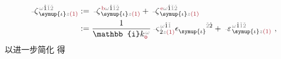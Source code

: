 \begin{subequations}
	\abovedisplayskip=-8pt
\begin{align} %
	\Xint{\begin{smallmatrix} ~ \\ {}^{}_{\mathcolor{gray}{-}} \\ ~ \end{smallmatrix}}{12}{\zeta}^{\;\! \mathcolor{gray}{\omega} \hat{1} \mathcolor{gray}{\check{1} \check{2}}}_{\;\! \symup{\iota} \mathcolor{gray}{z} \textcolor{Maroon}{(1)}} &:= \Xint{\begin{smallmatrix} ~ \\ {}^{}_{\mathcolor{gray}{-}} \\ ~ \end{smallmatrix}}{12}{\zeta}^{\;\! \textcolor{Maroon}{\text{b}} \mathcolor{gray}{\omega} \hat{1} \mathcolor{gray}{\check{1} \check{2}}}_{\;\! \symup{\iota} \mathcolor{gray}{z} \textcolor{Maroon}{(1)}} + \Xint{\begin{smallmatrix} ~ \\ {}^{}_{\mathcolor{gray}{-}} \\ ~ \end{smallmatrix}}{12}{\zeta}^{\;\! \textcolor{Maroon}{\text{e}} \mathcolor{gray}{\omega} \hat{1} \mathcolor{gray}{\check{1} \check{2}}}_{\;\! \symup{\iota} \mathcolor{gray}{z} \textcolor{Maroon}{(1)}} \label{eq:p<->n} \\ &:= \frac{1}{\mathbb{i} k_{\textcolor{Maroon}{\mathsf{o}}}^{\;\! \mathcolor{gray}{\omega}}} \Xint{\begin{smallmatrix} ~ \\ {}^{}_{\mathcolor{gray}{-}} \\ ~ \end{smallmatrix}}{13}{\varsigma}^{\;\! \mathcolor{gray}{\omega} \hat{1} \mathcolor{gray}{\check{1}}}_{\;\! \dot{2} \mathcolor{gray}{z} \textcolor{Maroon}{(1)}} \epsilon^{\hphantom{\symup{\iota}}\mathcolor{gray}{\check{2}}\dot{2}}_{\symup{\iota}} + \Xint{\begin{smallmatrix} ~ \\ {}^{}_{\mathcolor{gray}{-}} \\ ~ \end{smallmatrix}}{16}{\varepsilon}^{\;\! \mathcolor{gray}{\omega} \hat{1} \mathcolor{gray}{\check{1} \check{2}}}_{\;\! \symup{\iota} \mathcolor{gray}{z} \textcolor{Maroon}{(1)}}~,
\end{align}
\end{subequations}
以进一步简化  得

